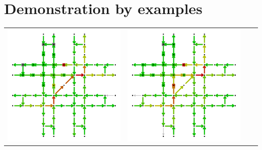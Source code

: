 \section{Demonstration by examples}
\label{section:evaluation}

\begin{table}[b]
	\centering
	\renewcommand{\arraystretch}{1.3}
	\begin{tabularx}{\textwidth}{|Y|Y|Y|Y|}
		\hline

		\includegraphics[trim=0 0 0 -4,scale=0.155]{../gfx/data/E1_003.png}  &
		\includegraphics[trim=0 0 0 -4,scale=0.155]{../gfx/data/E2_003.png}  &

\end{tabularx}
\end{table}
